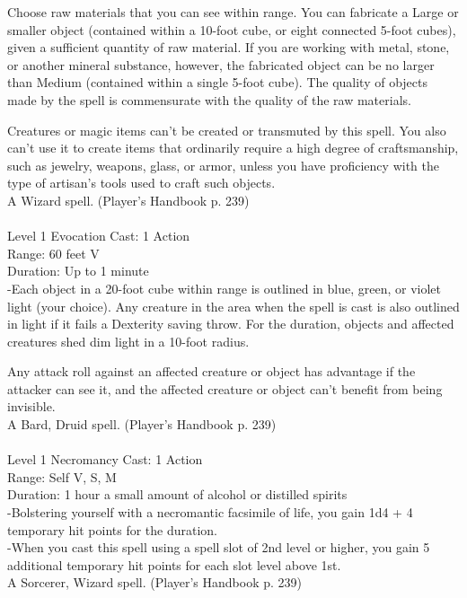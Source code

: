 \documentclass[10pt,twocolumn]{report}
\begin{document}
Choose raw materials that you can see within range. You can fabricate a Large or smaller object (contained within a 10-foot cube, or eight connected 5-foot cubes), given a sufficient quantity of raw material. If you are working with metal, stone, or another mineral substance, however, the fabricated object can be no larger than Medium (contained within a single 5-foot cube). The quality of objects made by the spell is commensurate with the quality of the raw materials. 

Creatures or magic items can’t be created or transmuted by this spell. You also can’t use it to create items that ordinarily require a high degree of craftsmanship, such as jewelry, weapons, glass, or armor, unless you have proficiency with the type of artisan’s tools used to craft such objects.\\
A Wizard spell. (Player's Handbook p. 239) \\


 \\
Level 1 \quad Evocation \quad Cast: 1 Action\\
Range: 60 feet \quad V\\
Duration: Up to 1 minute \quad \\
-Each object in a 20-foot cube within range is outlined in blue, green, or violet light (your choice). 
Any creature in the area when the spell is cast is also outlined in light if it fails a Dexterity saving throw. For the duration, objects and affected creatures shed dim light in a 10-foot radius. 

Any attack roll against an affected creature or object has advantage if the attacker can see it, and the affected creature or object can’t benefit from being invisible.\\
A Bard, Druid spell. (Player's Handbook p. 239) \\


 \\
Level 1 \quad Necromancy \quad Cast: 1 Action\\
Range: Self \quad V, S, M\\
Duration: 1 hour \quad a small amount of alcohol or distilled spirits\\
-Bolstering yourself with a necromantic facsimile of life, you gain 1d4 + 4 temporary hit points for the duration.\\
-When you cast this spell using a spell slot of 2nd level or higher, you gain 5 additional temporary hit points for each slot level above 1st.\\
A Sorcerer, Wizard spell. (Player's Handbook p. 239) \\
\end{document}
